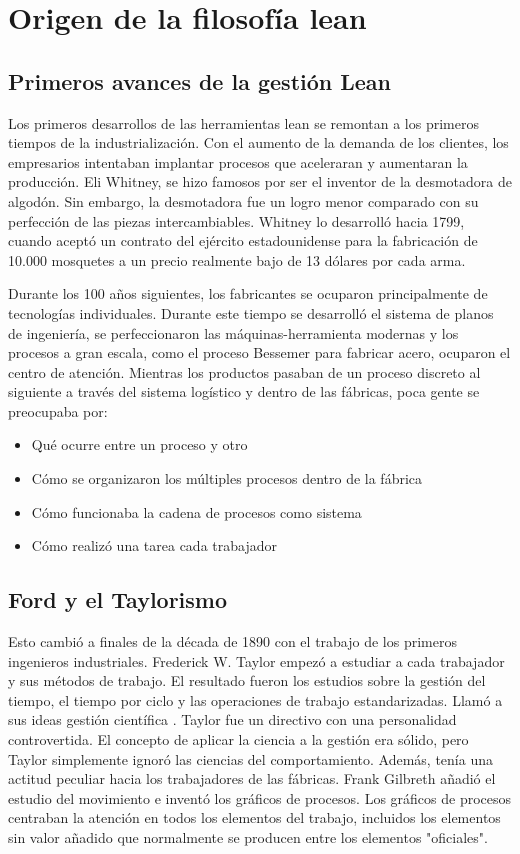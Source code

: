 \section{Origen de la filosofía lean}

\subsection{Primeros avances de la gestión Lean}

Los primeros desarrollos de las herramientas lean se remontan a los primeros tiempos de la industrialización.
Con el aumento de la demanda de los clientes, los empresarios intentaban implantar procesos que aceleraran y aumentaran la producción.
Eli Whitney, se hizo famosos por ser el inventor de la desmotadora de algodón.
Sin embargo, la desmotadora fue un logro menor comparado con su perfección de las piezas intercambiables.
Whitney lo desarrolló hacia 1799, cuando aceptó un contrato del ejército estadounidense para la fabricación de 10.000 mosquetes a un precio realmente bajo de 13 dólares por cada arma.

Durante los 100 años siguientes, los fabricantes se ocuparon principalmente de tecnologías individuales.
Durante este tiempo se desarrolló el sistema de planos de ingeniería, se perfeccionaron las máquinas-herramienta modernas y los procesos a gran escala, como el proceso Bessemer para fabricar acero, ocuparon el centro de atención.
Mientras los productos pasaban de un proceso discreto al siguiente a través del sistema logístico y dentro de las fábricas, poca gente se preocupaba por:

\begin{itemize}
    \item Qué ocurre entre un proceso y otro
    \item Cómo se organizaron los múltiples procesos dentro de la fábrica
    \item Cómo funcionaba la cadena de procesos como sistema
    \item Cómo realizó una tarea cada trabajador
\end{itemize}

\subsection{Ford y el Taylorismo}

Esto cambió a finales de la década de 1890 con el trabajo de los primeros ingenieros industriales.
Frederick W. Taylor empezó a estudiar a cada trabajador y sus métodos de trabajo.
El resultado fueron los estudios sobre la gestión del tiempo, el tiempo por ciclo y las operaciones de trabajo estandarizadas.
Llamó a sus ideas gestión científica \cite{hounshell_same_1988}.
Taylor fue un directivo con una personalidad controvertida.
El concepto de aplicar la ciencia a la gestión era sólido, pero Taylor simplemente ignoró las ciencias del comportamiento.
Además, tenía una actitud peculiar hacia los trabajadores de las fábricas.
Frank Gilbreth añadió el estudio del movimiento e inventó los gráficos de procesos.
Los gráficos de procesos centraban la atención en todos los elementos del trabajo, incluidos los elementos sin valor añadido que normalmente se producen entre los elementos "oficiales".

